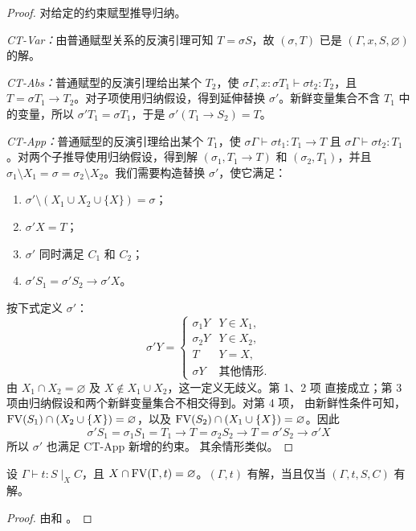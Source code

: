 \begin{proof}
对给定的约束赋型推导归纳。

\emph{CT-Var：}由普通赋型关系的反演引理可知 \(T=\sigma S\)，故
\((\sigma,T)\) 已是 \((\Gamma,x,S,\varnothing)\) 的解。

\emph{CT-Abs：}普通赋型的反演引理给出某个 \(T_2\)，使
\(\sigma\Gamma,x:\sigma T_1\vdash\sigma t_2:T_2\)，且
\(T=\sigma T_1\to T_2\)。对子项使用归纳假设，得到延伸替换
\(\sigma'\)。新鲜变量集合不含 \(T_1\) 中的变量，所以
\(\sigma'T_1=\sigma T_1\)，于是
\(\sigma'(T_1\to S_2)=T\)。

\emph{CT-App：}普通赋型的反演引理给出某个 \(T_1\)，使
\(\sigma\Gamma\vdash\sigma t_1:T_1\to T\) 且
\(\sigma\Gamma\vdash\sigma t_2:T_1\)。对两个子推导使用归纳假设，得到解
\((\sigma_1,T_1\to T)\) 和 \((\sigma_2,T_1)\)，并且
\(\sigma_1\setminus X_1=\sigma=\sigma_2\setminus X_2\)。我们需要构造替换
\(\sigma'\)，使它满足：
\begin{enumerate}
  \item \(\sigma'\setminus(X_1\cup X_2\cup\{X\})=\sigma\)；
  \item \(\sigma'X=T\)；
  \item \(\sigma'\) 同时满足 \(C_1\) 和 \(C_2\)；
  \item \(\sigma'S_1=\sigma'S_2\to\sigma'X\)。
\end{enumerate}
按下式定义 \(\sigma'\)：
\[
\sigma'Y=
\begin{cases}
  \sigma_1Y & Y\in X_1,\\
  \sigma_2Y & Y\in X_2,\\
  T         & Y=X,\\
  \sigma Y  & \text{其他情形}.
\end{cases}
\]
由 \(X_1\cap X_2=\varnothing\) 及 \(X\notin X_1\cup X_2\)，这一定义无歧义。第 1、2 项
直接成立；第 3 项由归纳假设和两个新鲜变量集合不相交得到。对第 4 项，
由新鲜性条件可知，
\(\operatorname{FV}(S_1)\cap(X_2\cup\{X\})=\varnothing\)，以及
\(\operatorname{FV}(S_2)\cap(X_1\cup\{X\})=\varnothing\)。因此
\[
\sigma'S_1=\sigma_1S_1=T_1\to T
=\sigma_2S_2\to T
=\sigma'S_2\to\sigma'X
\]
所以 \(\sigma'\) 也满足 CT-App 新增的约束。
其余情形类似。
\end{proof}

\begin{corollary}
\label{cor:22.3.8}
设 \(\Gamma\vdash t:S\mid_X C\)，且
\(X\cap\operatorname{FV}(\Gamma,t)=\varnothing\)。\((\Gamma,t)\) 有解，当且仅当
\((\Gamma,t,S,C)\) 有解。
\end{corollary}

\begin{proof}
由和
。
\end{proof}

